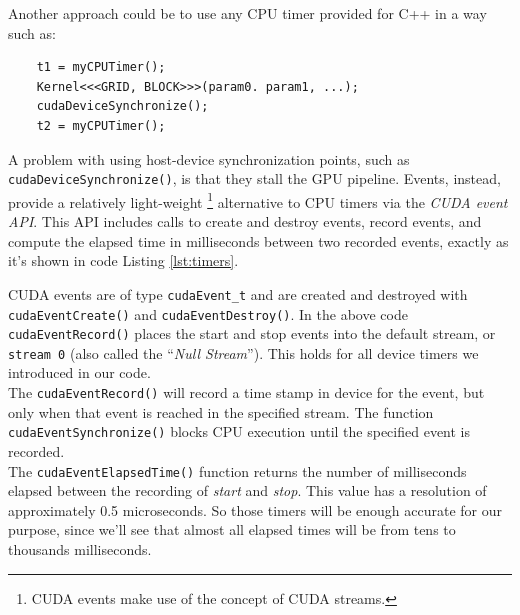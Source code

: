 Another approach could be to use any CPU timer provided for C++ in a way such as:
\begin{lstlisting}
	t1 = myCPUTimer();
	Kernel<<<GRID, BLOCK>>>(param0. param1, ...);
	cudaDeviceSynchronize();
	t2 = myCPUTimer();
\end{lstlisting}
A problem with using host-device synchronization points, such as \texttt{cudaDeviceSynchronize()}, is that they stall the GPU pipeline.
Events, instead, provide a relatively light-weight \footnote{CUDA events make use of the concept of CUDA streams.} alternative to CPU timers via the \textit{CUDA event API}\cite{devblogevents}. This API includes calls to create and destroy events, record events, and compute the elapsed time in milliseconds between two recorded events, exactly as it's shown in code Listing \ref{lst:timers}.
 
CUDA events are of type \texttt{cudaEvent\_t} and are created and destroyed with \texttt{cudaEventCreate()} and \texttt{cudaEventDestroy()}. In the above code \texttt{cudaEventRecord()} places the start and stop events into the default stream, or \texttt{stream 0} (also called the “\textit{Null Stream}”)\cite{cudaguide}. This holds for all device timers we introduced in our code.\\
The \texttt{cudaEventRecord()} will record a time stamp in device for the event, but only when that event is reached in the specified stream. The function \texttt{cudaEventSynchronize()} blocks CPU execution until the specified event is recorded.\\
The \texttt{cudaEventElapsedTime()} function returns the number of milliseconds elapsed between the recording of \textit{start} and \textit{stop}. This value has a resolution of approximately 0.5 microseconds\cite{devblogevents,cudaguide}. So those timers will be enough accurate for our purpose, since we'll see that almost all elapsed times will be from tens to thousands milliseconds.

